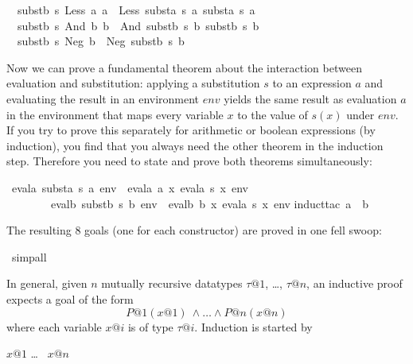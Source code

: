 \begin{isabellebody}
\isanewline
\ \ {\isachardoublequote}substb\ s\ {\isacharparenleft}Less\ a{}\ a{}{\isacharparenright}\ {\isacharequal}\ Less\ {\isacharparenleft}substa\ s\ a{}{\isacharparenright}\ {\isacharparenleft}substa\ s\ a{}{\isacharparenright}{\isachardoublequote}\isanewline
\ \ {\isachardoublequote}substb\ s\ {\isacharparenleft}And\ b{}\ b{}{\isacharparenright}\ {\isacharequal}\ And\ {\isacharparenleft}substb\ s\ b{}{\isacharparenright}\ {\isacharparenleft}substb\ s\ b{}{\isacharparenright}{\isachardoublequote}\isanewline
\ \ {\isachardoublequote}substb\ s\ {\isacharparenleft}Neg\ b{\isacharparenright}\ {\isacharequal}\ Neg\ {\isacharparenleft}substb\ s\ b{\isacharparenright}{\isachardoublequote}%
\begin{isamarkuptext}%
Now we can prove a fundamental theorem about the interaction between
evaluation and substitution: applying a substitution $s$ to an expression $a$
and evaluating the result in an environment $env$ yields the same result as
evaluation $a$ in the environment that maps every variable $x$ to the value
of $s(x)$ under $env$. If you try to prove this separately for arithmetic or
boolean expressions (by induction), you find that you always need the other
theorem in the induction step. Therefore you need to state and prove both
theorems simultaneously:%
\end{isamarkuptext}%
\ {\isachardoublequote}evala\ {\isacharparenleft}substa\ s\ a{\isacharparenright}\ env\ {\isacharequal}\ evala\ a\ {\isacharparenleft}{\isasymlambda}x{\isachardot}\ evala\ {\isacharparenleft}s\ x{\isacharparenright}\ env{\isacharparenright}\ {\isasymand}\isanewline
\ \ \ \ \ \ \ \ evalb\ {\isacharparenleft}substb\ s\ b{\isacharparenright}\ env\ {\isacharequal}\ evalb\ b\ {\isacharparenleft}{\isasymlambda}x{\isachardot}\ evala\ {\isacharparenleft}s\ x{\isacharparenright}\ env{\isacharparenright}{\isachardoublequote}\isanewline
{}induct{\isacharunderscore}tac\ a\ \ b{\isacharparenright}%
\begin{isamarkuptxt}%
\noindent
The resulting 8 goals (one for each constructor) are proved in one fell swoop:%
\end{isamarkuptxt}%
\ simp{\isacharunderscore}all%
\begin{isamarkuptext}%
In general, given $n$ mutually recursive datatypes $\tau@1$, \dots, $\tau@n$,
an inductive proof expects a goal of the form
\[ P@1(x@1)\ \land \dots \land P@n(x@n) \]
where each variable $x@i$ is of type $\tau@i$. Induction is started by
\begin{isabelle}
 $x@1$  \dots\  $x@n$\isa{{\isacharparenright}}
\end{isabelle}


\end{isamarkuptext}
\end{isabellebody}
